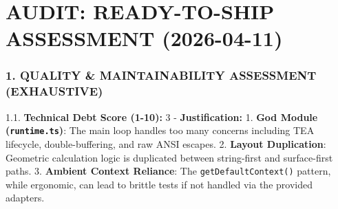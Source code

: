 \chapter{AUDIT: READY-TO-SHIP ASSESSMENT (2026-04-11)}\label{record-415}

\smallskip

\subsection{1. QUALITY \& MAINTAINABILITY ASSESSMENT (EXHAUSTIVE)}\label{record-415-quality-maintainability-assessment-exhaustive}

1.1. \textbf{Technical Debt Score (1-10):} 3 - \textbf{Justification:} 1. \textbf{God Module (\texttt{r\allowbreak{}u\allowbreak{}n\allowbreak{}t\allowbreak{}i\allowbreak{}m\allowbreak{}e\allowbreak{}.\allowbreak{}t\allowbreak{}s})}: The main loop handles too many concerns including TEA lifecycle, double-buffering, and raw ANSI escapes. 2. \textbf{Layout Duplication}: Geometric calculation logic is duplicated between string-first and surface-first paths. 3. \textbf{Ambient Context Reliance}: The \texttt{g\allowbreak{}e\allowbreak{}t\allowbreak{}D\allowbreak{}e\allowbreak{}f\allowbreak{}a\allowbreak{}u\allowbreak{}l\allowbreak{}t\allowbreak{}C\allowbreak{}o\allowbreak{}n\allowbreak{}t\allowbreak{}e\allowbreak{}x\allowbreak{}t\allowbreak{}(\allowbreak{})} pattern, while ergonomic, can lead to brittle tests if not handled via the provided adapters.

